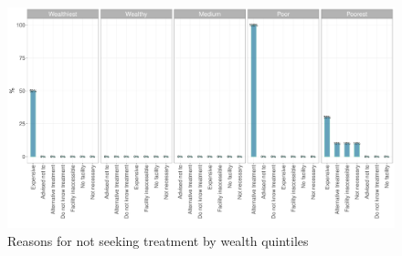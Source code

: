 \documentclass[12pt,a4paper]{article}
\begin{document}
\begin{figure}[H]

{\centering \includegraphics{kayinReport_files/figure-latex/diarrhoea4plot-1} 

}

\caption{Reasons for not seeking treatment by wealth quintiles}\label{fig:diarrhoea4plot}
\end{figure}
\end{document}

